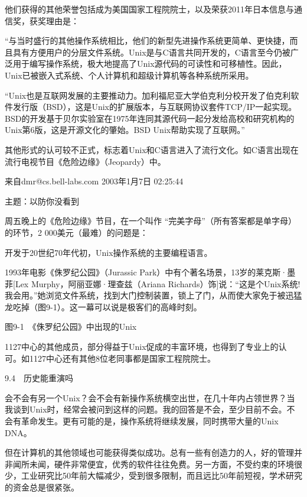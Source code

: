 \documentclass[a4paper,12pt,UTF8,twoside]{ctexbook}
\begin{document}
他们获得的其他荣誉包括成为美国国家工程院院士，以及荣获2011年日本信息与通信奖，获奖理由是：

“与当时盛行的其他操作系统相比，他们的新型先进操作系统更简单、更快捷，而且具有方便用户的分层文件系统。Unix是与C语言共同开发的，C语言至今仍被广泛用于编写操作系统，极大地提高了Unix源代码的可读性和可移植性。因此，Unix已被嵌入式系统、个人计算机和超级计算机等各种系统所采用。

“Unix也是互联网发展的主要推动力。加利福尼亚大学伯克利分校开发了伯克利软件发行版（BSD），这是Unix的扩展版本，与互联网协议套件TCP/IP一起实现。BSD的开发基于贝尔实验室在1975年连同其源代码一起分发给高校和研究机构的Unix第6版，这是开源文化的肇始。BSD Unix帮助实现了互联网。”



其他形式的认可较不正式，标志着Unix和C语言进入了流行文化。如C语言出现在流行电视节目《危险边缘》（Jeopardy）中。



来自dmr@cs.bell-labs.com 2003年1月7日 02:25:44

主题：以防你没看到

周五晚上的《危险边缘》节目，在一个叫作 “完美字母”（所有答案都是单字母）的环节，2 000美元（最难）的问题是：

开发于20世纪70年代初，Unix操作系统的主要编程语言。



1993年电影《侏罗纪公园》（Jurassic Park）中有个著名场景，13岁的莱克斯·墨菲[Lex Murphy，阿丽亚娜·理查兹（Ariana Richards）饰]说：“这是个Unix系统! 我会用。”她浏览文件系统，找到大门控制装置，锁上了门，从而使大家免于被迅猛龙吃掉（图9-1）。这一幕可以说是极客们的高峰时刻。



图9-1　《侏罗纪公园》中出现的Unix

1127中心的其他成员，部分得益于Unix促成的丰富环境，也得到了专业上的认可。如1127中心还有其他8位老同事都是国家工程院院士。





9.4　历史能重演吗


会不会有另一个Unix？会不会有新操作系统横空出世，在几十年内占领世界？当我谈到Unix时，经常会被问到这样的问题。我的回答是不会，至少目前不会。不会有革命发生。更有可能的是，操作系统将继续发展，同时携带大量的Unix DNA。

但在计算机的其他领域也可能获得类似成功。总有一些有创造力的人，好的管理并非闻所未闻，硬件非常便宜，优秀的软件往往免费。另一方面，不受约束的环境很少，工业研究比50年前大幅减少，受到很多限制，而且远比50年前短视，学术研究的资金总是很紧张。
\end{document}
